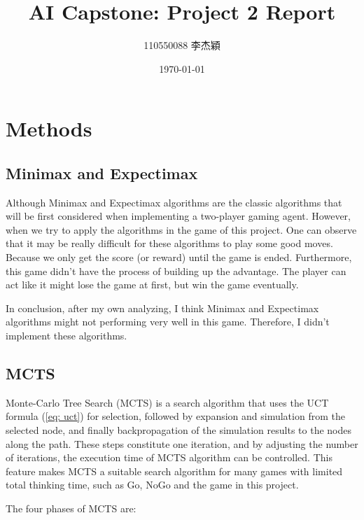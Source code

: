\documentclass[twocolumn]{extarticle}
\title{AI Capstone: Project 2 Report}
\author{110550088 李杰穎}
\date{\today}
\begin{document}
\maketitle

\section{Methods}

\subsection{Minimax and Expectimax}

Although Minimax and Expectimax algorithms are the classic algorithms that will be first considered when implementing a two-player gaming agent. However, when we try to apply the algorithms in the game of this project. One can observe that it may be really difficult for these algorithms to play some good moves. Because we only get the score (or reward) until the game is ended. Furthermore, this game didn't have the process of building up the advantage. The player can act like it might lose the game at first, but win the game eventually.

In conclusion, after my own analyzing, I think Minimax and Expectimax algorithms might not performing very well in this game. Therefore, I didn't implement these algorithms.

\subsection{MCTS}
Monte-Carlo Tree Search (MCTS) is a search algorithm that uses the UCT formula (\autoref{eq: uct}) for selection, followed by expansion and simulation from the selected node, and finally backpropagation of the simulation results to the nodes along the path. These steps constitute one iteration, and by adjusting the number of iterations, the execution time of MCTS algorithm can be controlled. This feature makes MCTS a suitable search algorithm for many games with limited total thinking time, such as Go, NoGo and the game in this project.

The four phases of MCTS are:
\end{document}
